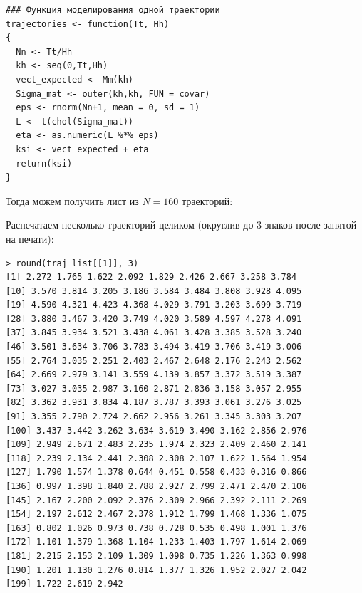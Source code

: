 \documentclass[14pt,a4paper]{scrartcl}
\begin{document}
\begin{verbatim}
### Функция моделирования одной траектории
trajectories <- function(Tt, Hh)
{
  Nn <- Tt/Hh
  kh <- seq(0,Tt,Hh)
  vect_expected <- Mm(kh)
  Sigma_mat <- outer(kh,kh, FUN = covar)
  eps <- rnorm(Nn+1, mean = 0, sd = 1)
  L <- t(chol(Sigma_mat))
  eta <- as.numeric(L %*% eps)
  ksi <- vect_expected + eta
  return(ksi)
}
\end{verbatim}
	
Тогда можем получить лист из $N=160$ траекторий:

	
Распечатаем несколько траекторий целиком (округлив до 3 знаков после запятой на печати):

\begin{verbatim}
> round(traj_list[[1]], 3)
[1] 2.272 1.765 1.622 2.092 1.829 2.426 2.667 3.258 3.784
[10] 3.570 3.814 3.205 3.186 3.584 3.484 3.808 3.928 4.095
[19] 4.590 4.321 4.423 4.368 4.029 3.791 3.203 3.699 3.719
[28] 3.880 3.467 3.420 3.749 4.020 3.589 4.597 4.278 4.091
[37] 3.845 3.934 3.521 3.438 4.061 3.428 3.385 3.528 3.240
[46] 3.501 3.634 3.706 3.783 3.494 3.419 3.706 3.419 3.006
[55] 2.764 3.035 2.251 2.403 2.467 2.648 2.176 2.243 2.562
[64] 2.669 2.979 3.141 3.559 4.139 3.857 3.372 3.519 3.387
[73] 3.027 3.035 2.987 3.160 2.871 2.836 3.158 3.057 2.955
[82] 3.362 3.931 3.834 4.187 3.787 3.393 3.061 3.276 3.025
[91] 3.355 2.790 2.724 2.662 2.956 3.261 3.345 3.303 3.207
[100] 3.437 3.442 3.262 3.634 3.619 3.490 3.162 2.856 2.976
[109] 2.949 2.671 2.483 2.235 1.974 2.323 2.409 2.460 2.141
[118] 2.239 2.134 2.441 2.308 2.308 2.107 1.622 1.564 1.954
[127] 1.790 1.574 1.378 0.644 0.451 0.558 0.433 0.316 0.866
[136] 0.997 1.398 1.840 2.788 2.927 2.799 2.471 2.470 2.106
[145] 2.167 2.200 2.092 2.376 2.309 2.966 2.392 2.111 2.269
[154] 2.197 2.612 2.467 2.378 1.912 1.799 1.468 1.336 1.075
[163] 0.802 1.026 0.973 0.738 0.728 0.535 0.498 1.001 1.376
[172] 1.101 1.379 1.368 1.104 1.233 1.403 1.797 1.614 2.069
[181] 2.215 2.153 2.109 1.309 1.098 0.735 1.226 1.363 0.998
[190] 1.201 1.130 1.276 0.814 1.377 1.326 1.952 2.027 2.042
[199] 1.722 2.619 2.942
\end{verbatim}
	
\end{document}
